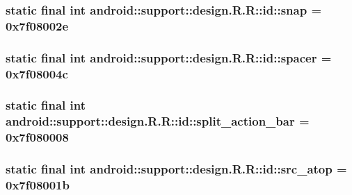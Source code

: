 \hypertarget{classandroid_1_1support_1_1design_1_1_r_1_1id_82af533573410b493ba219ad7a06e7b9}{
\subsubsection[{snap}]{\setlength{\rightskip}{0pt plus 5cm}static final int android::support::design.R.R::id::snap = 0x7f08002e}}
\label{classandroid_1_1support_1_1design_1_1_r_1_1id_82af533573410b493ba219ad7a06e7b9}


\hypertarget{classandroid_1_1support_1_1design_1_1_r_1_1id_830fc428b39023aae3ce563b0d705fa9}{
\subsubsection[{spacer}]{\setlength{\rightskip}{0pt plus 5cm}static final int android::support::design.R.R::id::spacer = 0x7f08004c}}
\label{classandroid_1_1support_1_1design_1_1_r_1_1id_830fc428b39023aae3ce563b0d705fa9}


\hypertarget{classandroid_1_1support_1_1design_1_1_r_1_1id_a1d38b7e69699eb8dc26527922db9177}{
\subsubsection[{split\_\-action\_\-bar}]{\setlength{\rightskip}{0pt plus 5cm}static final int android::support::design.R.R::id::split\_\-action\_\-bar = 0x7f080008}}
\label{classandroid_1_1support_1_1design_1_1_r_1_1id_a1d38b7e69699eb8dc26527922db9177}


\hypertarget{classandroid_1_1support_1_1design_1_1_r_1_1id_eb2525c006cf82c0cecd8cbfd7f0ac1f}{
\subsubsection[{src\_\-atop}]{\setlength{\rightskip}{0pt plus 5cm}static final int android::support::design.R.R::id::src\_\-atop = 0x7f08001b}}
\label{classandroid_1_1support_1_1design_1_1_r_1_1id_eb2525c006cf82c0cecd8cbfd7f0ac1f}


